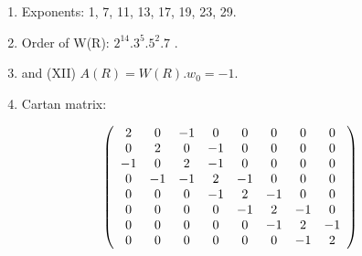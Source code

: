 \begin{enumerate}
\def\labelenumi{(\Roman{enumi})}
\setcounter{enumi}{8}
\item
  Exponents: 1, 7, 11, 13, 17, 19, 23, 29.
\item
  Order of W(R): \(2^{14}.3^{5}.5^{2}.7\) .
\item
  and (XII) \(A(R) = W(R). w_0 = -1.\)
\item
  Cartan matrix:
\end{enumerate}

\[
\left( \begin{array}{c c c c c c c c} 2 & 0 & - 1 & 0 & 0 & 0 & 0 & 0 \\ 0 & 2 & 0 & - 1 & 0 & 0 & 0 & 0 \\ - 1 & 0 & 2 & - 1 & 0 & 0 & 0 & 0 \\ 0 & - 1 & - 1 & 2 & - 1 & 0 & 0 & 0 \\ 0 & 0 & 0 & - 1 & 2 & - 1 & 0 & 0 \\ 0 & 0 & 0 & 0 & - 1 & 2 & - 1 & 0 \\ 0 & 0 & 0 & 0 & 0 & - 1 & 2 & - 1 \\ 0 & 0 & 0 & 0 & 0 & 0 & - 1 & 2 \end{array} \right)
\]


